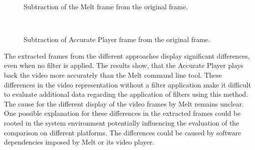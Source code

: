 \documentclass[../MasterThesis.tex]{subfiles}
\begin{document}
\begin{minipage}{0.48\textwidth}
	\begin{figure}[H]
		\begin{center}
			\caption[Subtraction of the Melt frame from the original frame.]{Subtraction of the Melt frame from the original frame.}
			\label{figure:oVSmelt}
		\end{center}
	\end{figure}
\end{minipage}\begin{minipage}{0.04\textwidth}
	\ 
\end{minipage}\begin{minipage}{0.48\textwidth}
	\begin{figure}[H]
		\begin{center}
			\caption[Subtraction of Accurate Player frame from the original frame.]{Subtraction of Accurate Player frame from the original frame.}
			\label{figure:oVSap}
		\end{center}
	\end{figure}
\end{minipage}








\vspace*{1.5em}
The extracted frames from the different approaches display significant differences, even when no filter is applied. 
The results show, that the Accurate Player plays back the video more accurately than the Melt command line tool.
These differences in the video representation without a filter application make it difficult to evaluate additional data regarding the application of filters using this method. The cause for the different display of the video frames by Melt remains unclear.
%
%
One possible explanation for these differences in the extracted frames could be rooted in the system environment potentially influencing the evaluation of the comparison on different platforms. The differences could be caused by software dependencies imposed by Melt or its video player.
\end{document}
